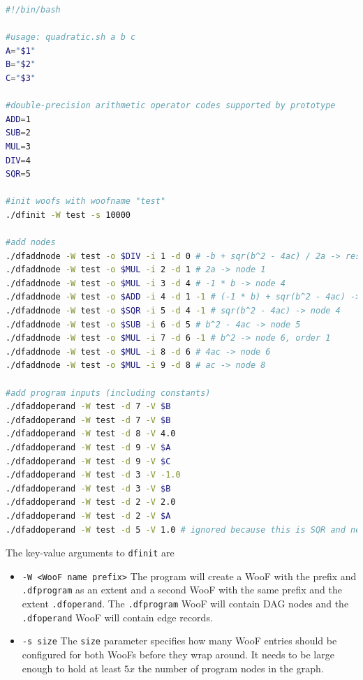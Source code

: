 \documentclass[10pt]{article}
\begin{document}
\begin{lstlisting}[language=bash,caption={quadratic.sh},label={lst:quad}]
#!/bin/bash

#usage: quadratic.sh a b c
A="$1"
B="$2"
C="$3"

#double-precision arithmetic operator codes supported by prototype
ADD=1
SUB=2
MUL=3
DIV=4
SQR=5

#init woofs with woofname "test"
./dfinit -W test -s 10000

#add nodes
./dfaddnode -W test -o $DIV -i 1 -d 0 # -b + sqr(b^2 - 4ac) / 2a -> result
./dfaddnode -W test -o $MUL -i 2 -d 1 # 2a -> node 1
./dfaddnode -W test -o $MUL -i 3 -d 4 # -1 * b -> node 4
./dfaddnode -W test -o $ADD -i 4 -d 1 -1 # (-1 * b) + sqr(b^2 - 4ac) -> node 1, order 1
./dfaddnode -W test -o $SQR -i 5 -d 4 -1 # sqr(b^2 - 4ac) -> node 4
./dfaddnode -W test -o $SUB -i 6 -d 5 # b^2 - 4ac -> node 5
./dfaddnode -W test -o $MUL -i 7 -d 6 -1 # b^2 -> node 6, order 1
./dfaddnode -W test -o $MUL -i 8 -d 6 # 4ac -> node 6
./dfaddnode -W test -o $MUL -i 9 -d 8 # ac -> node 8

#add program inputs (including constants)
./dfaddoperand -W test -d 7 -V $B
./dfaddoperand -W test -d 7 -V $B
./dfaddoperand -W test -d 8 -V 4.0
./dfaddoperand -W test -d 9 -V $A
./dfaddoperand -W test -d 9 -V $C
./dfaddoperand -W test -d 3 -V -1.0
./dfaddoperand -W test -d 3 -V $B
./dfaddoperand -W test -d 2 -V 2.0
./dfaddoperand -W test -d 2 -V $A
./dfaddoperand -W test -d 5 -V 1.0 # ignored because this is SQR and need two op

\end{lstlisting}
The key-value arguments to \verb+dfinit+ are
\begin{itemize}
\item \verb+-W <WooF name prefix>+ The program will create a WooF with the
prefix and \verb+.dfprogram+ as an extent and a second WooF with the same
prefix and the extent \verb+.dfoperand+.  The \verb+.dfprogram+ WooF will
contain DAG nodes and the \verb+.dfoperand+ WooF will contain edge records.
\item \verb+-s size+ The \verb+size+ parameter specifies how many WooF entries
should be configured for both WooFs before they wrap around.  It needs to be
large enough to hold at least $5x$ the number of program nodes in the graph.
\end{itemize}
\end{document}
